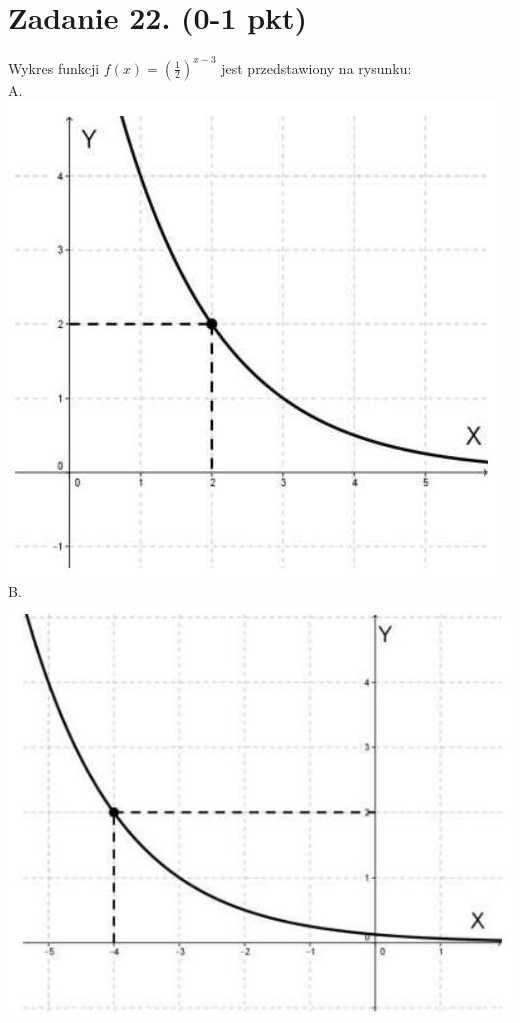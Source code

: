 \documentclass[10pt]{article}
\begin{document}
\section*{Zadanie 22. (0-1 pkt)}
Wykres funkcji \(f(x)=\left(\frac{1}{2}\right)^{x-3}\) jest przedstawiony na rysunku:\\
A.\\
\includegraphics[max width=\textwidth, center]{2024_11_21_b8ac5f500a5bbb1b4ec5g-10(3)}\\
B.\\
\includegraphics[max width=\textwidth, center]{2024_11_21_b8ac5f500a5bbb1b4ec5g-10(1)}\\
\end{document}
